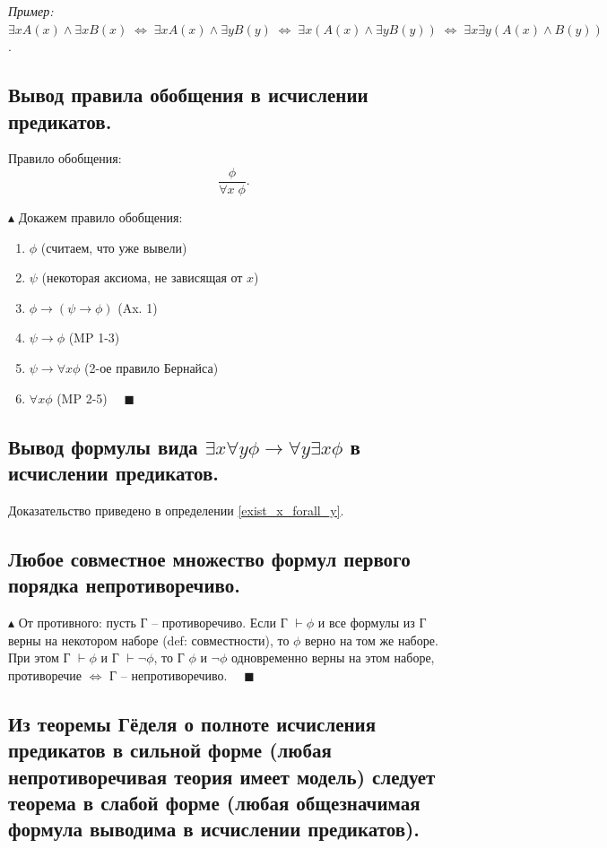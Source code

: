 \textit{Пример:} $\exists x A(x) \land \exists xB(x) \; \Leftrightarrow \; \exists x A(x) \land \exists yB(y) \; \Leftrightarrow \; \exists x (A(x) \land \exists yB(y)) \; \Leftrightarrow \; \exists x\exists y( A(x) \land B(y))$.

\subsection{Вывод правила обобщения в исчислении предикатов.}
Правило обобщения: $$\frac{\phi}{\forall x \;\phi}.$$

$\blacktriangle$ Докажем правило обобщения:
\begin{enumerate}
    \item $\phi$ (считаем, что уже вывели)
    \item $\psi$ (некоторая аксиома, не зависящая от $x$)
    \item $\phi\to(\psi\to\phi)$ (Ax. 1)
    \item $\psi\to\phi$ (MP 1-3)
    \item $\psi\to\forall x \phi$ (2-ое правило Бернайса)
    \item $\forall x \phi$ (MP 2-5) $\quad \blacksquare$
\end{enumerate}

\subsection{Вывод формулы вида $\exists x \forall y \phi \to \forall y \exists x \phi$ в исчислении предикатов.}

Доказательство приведено в определении \ref{exist_x_forall_y}.

\subsection{Любое совместное множество формул первого порядка непротиворечиво.}
$\blacktriangle$ От противного: пусть Г -- противоречиво. Если Г $\vdash \phi$ и все формулы из Г верны на некотором наборе (def: совместности), то $\phi$ верно на том же наборе. При этом Г $\vdash \phi$ и Г $\vdash \neg\phi$, то Г $\phi$ и $\neg\phi$ одновременно верны на этом наборе, противоречие $\Leftrightarrow$ Г -- непротиворечиво. $\quad \blacksquare$

\subsection{Из теоремы Гёделя о полноте исчисления предикатов в сильной форме (любая непротиворечивая теория имеет модель) следует теорема в слабой форме (любая общезначимая формула выводима в исчислении предикатов).}

